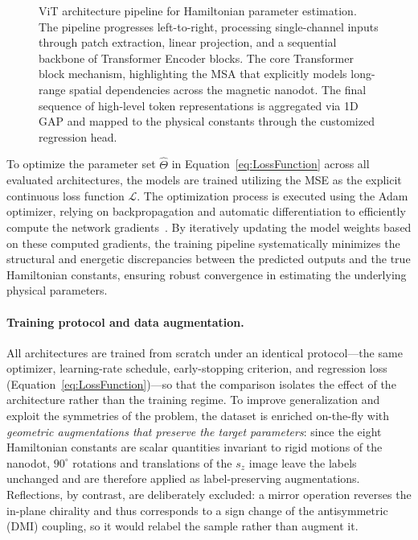 \documentclass[letterpaper, 12, one column]{article}
\begin{document}
\begin{itemize}
\begin{figure}[H]
    \centering
    \resizebox{\linewidth}{!}{
    }
\caption{ViT architecture pipeline for Hamiltonian parameter estimation. The pipeline progresses left-to-right, processing single-channel inputs through patch extraction, linear projection, and a sequential backbone of Transformer Encoder blocks. The core Transformer block mechanism, highlighting the MSA that explicitly models long-range spatial dependencies across the magnetic nanodot. The final sequence of high-level token representations is aggregated via 1D GAP and mapped to the physical constants through the customized regression head.}
\label{fig:vit_implementation}
\end{figure}


To optimize the parameter set $\hat{\Theta}$ in Equation~\ref{eq:LossFunction} across all evaluated architectures, the models are trained utilizing the MSE as the explicit continuous loss function $\mathcal{L}$. The optimization process is executed using the Adam optimizer, relying on backpropagation and automatic differentiation to efficiently compute the network gradients~\cite{murakami2022inverse}. By iteratively updating the model weights based on these computed gradients, the training pipeline systematically minimizes the structural and energetic discrepancies between the predicted outputs and the true Hamiltonian constants, ensuring robust convergence in estimating the underlying physical parameters.

\end{itemize}


\paragraph{Training protocol and data augmentation.}
All architectures are trained from scratch under an identical protocol---the same optimizer, learning-rate schedule, early-stopping criterion, and regression loss (Equation~\ref{eq:LossFunction})---so that the comparison isolates the effect of the architecture rather than the training regime. To improve generalization and exploit the symmetries of the problem, the dataset is enriched on-the-fly with \emph{geometric augmentations that preserve the target parameters}: since the eight Hamiltonian constants are scalar quantities invariant to rigid motions of the nanodot, $90^{\circ}$ rotations and translations of the $s_z$ image leave the labels unchanged and are therefore applied as label-preserving augmentations. Reflections, by contrast, are deliberately excluded: a mirror operation reverses the in-plane chirality and thus corresponds to a sign change of the antisymmetric (DMI) coupling, so it would relabel the sample rather than augment it.
\end{document}
